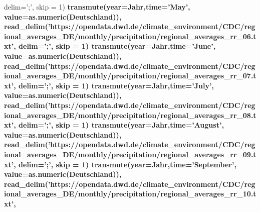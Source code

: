 \documentclass[
]{article}
\newenvironment{Shaded}{\begin{snugshade}}{\end{snugshade}}
\newcommand{\DataTypeTok}[1]{\textcolor[rgb]{0.13,0.29,0.53}{#1}}
\newcommand{\DecValTok}[1]{\textcolor[rgb]{0.00,0.00,0.81}{#1}}
\newcommand{\KeywordTok}[1]{\textcolor[rgb]{0.13,0.29,0.53}{\textbf{#1}}}
\newcommand{\NormalTok}[1]{#1}
\newcommand{\OperatorTok}[1]{\textcolor[rgb]{0.81,0.36,0.00}{\textbf{#1}}}
\newcommand{\StringTok}[1]{\textcolor[rgb]{0.31,0.60,0.02}{#1}}
\begin{document}
\begin{Shaded}
\begin{Highlighting}[]
{{{{{{{{{{               \DataTypeTok{delim=}\StringTok{';'}\NormalTok{, }\DataTypeTok{skip =} \DecValTok{1}\NormalTok{) }\OperatorTok{%
\StringTok{      }\KeywordTok{transmute}\NormalTok{(}\DataTypeTok{year=}\NormalTok{Jahr,}\DataTypeTok{time=}\StringTok{'May'}\NormalTok{, }\DataTypeTok{value=}\KeywordTok{as.numeric}\NormalTok{(Deutschland)),}
    \KeywordTok{read_delim}\NormalTok{(}\StringTok{'https://opendata.dwd.de/climate_environment/CDC/regional_averages_DE/monthly/precipitation/regional_averages_rr_06.txt'}\NormalTok{,}
               \DataTypeTok{delim=}\StringTok{';'}\NormalTok{, }\DataTypeTok{skip =} \DecValTok{1}\NormalTok{) }\OperatorTok{%
\StringTok{      }\KeywordTok{transmute}\NormalTok{(}\DataTypeTok{year=}\NormalTok{Jahr,}\DataTypeTok{time=}\StringTok{'June'}\NormalTok{, }\DataTypeTok{value=}\KeywordTok{as.numeric}\NormalTok{(Deutschland)),}
    \KeywordTok{read_delim}\NormalTok{(}\StringTok{'https://opendata.dwd.de/climate_environment/CDC/regional_averages_DE/monthly/precipitation/regional_averages_rr_07.txt'}\NormalTok{,}
               \DataTypeTok{delim=}\StringTok{';'}\NormalTok{, }\DataTypeTok{skip =} \DecValTok{1}\NormalTok{) }\OperatorTok{%
\StringTok{      }\KeywordTok{transmute}\NormalTok{(}\DataTypeTok{year=}\NormalTok{Jahr,}\DataTypeTok{time=}\StringTok{'July'}\NormalTok{, }\DataTypeTok{value=}\KeywordTok{as.numeric}\NormalTok{(Deutschland)),}
    \KeywordTok{read_delim}\NormalTok{(}\StringTok{'https://opendata.dwd.de/climate_environment/CDC/regional_averages_DE/monthly/precipitation/regional_averages_rr_08.txt'}\NormalTok{,}
               \DataTypeTok{delim=}\StringTok{';'}\NormalTok{, }\DataTypeTok{skip =} \DecValTok{1}\NormalTok{) }\OperatorTok{%
\StringTok{      }\KeywordTok{transmute}\NormalTok{(}\DataTypeTok{year=}\NormalTok{Jahr,}\DataTypeTok{time=}\StringTok{'August'}\NormalTok{, }\DataTypeTok{value=}\KeywordTok{as.numeric}\NormalTok{(Deutschland)),}
    \KeywordTok{read_delim}\NormalTok{(}\StringTok{'https://opendata.dwd.de/climate_environment/CDC/regional_averages_DE/monthly/precipitation/regional_averages_rr_09.txt'}\NormalTok{,}
               \DataTypeTok{delim=}\StringTok{';'}\NormalTok{, }\DataTypeTok{skip =} \DecValTok{1}\NormalTok{) }\OperatorTok{%
\StringTok{      }\KeywordTok{transmute}\NormalTok{(}\DataTypeTok{year=}\NormalTok{Jahr,}\DataTypeTok{time=}\StringTok{'September'}\NormalTok{, }\DataTypeTok{value=}\KeywordTok{as.numeric}\NormalTok{(Deutschland)),}
    \KeywordTok{read_delim}\NormalTok{(}\StringTok{'https://opendata.dwd.de/climate_environment/CDC/regional_averages_DE/monthly/precipitation/regional_averages_rr_10.txt'}\NormalTok{,}
}}}}}}}}}}}}}}}
\end{Highlighting}
\end{Shaded}
\end{document}
